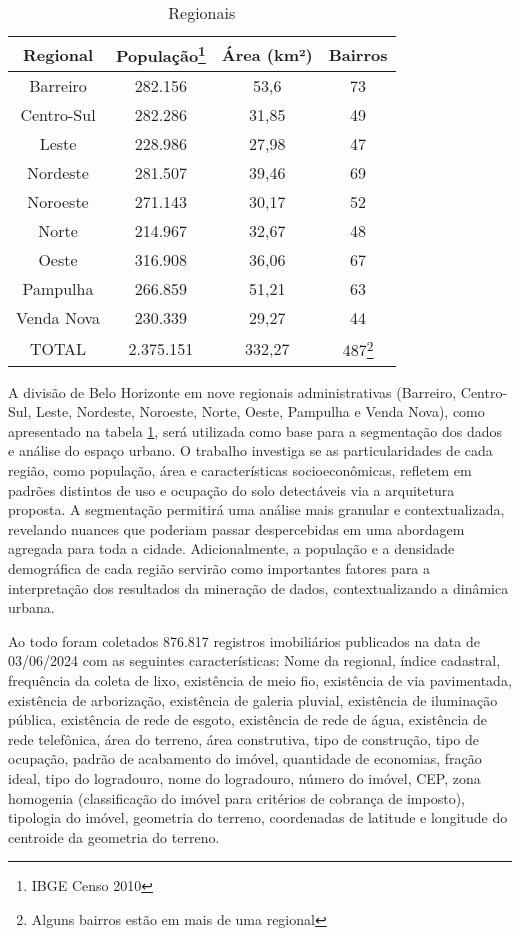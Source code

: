 \documentclass[12pt]{article}
\begin{document}
\begin{table}[h]
    \centering
    \begin{tabular}{cccc}
Regional & População\footnote{IBGE Censo 2010} & Área (km²) & Bairros\\
\hline
Barreiro & 282.156 & 53,6 & 73\\
Centro-Sul & 282.286 & 31,85 & 49\\
Leste & 228.986 & 27,98 & 47\\
Nordeste & 281.507 & 39,46 & 69\\
Noroeste & 271.143 & 30,17 & 52\\
Norte & 214.967 & 32,67 & 48\\
Oeste & 316.908 & 36,06 & 67\\
Pampulha & 266.859 & 51,21 & 63\\
Venda Nova & 230.339 & 29,27 & 44\\
\hline
\hline
TOTAL & 2.375.151 & 332,27 & 487\footnote{Alguns bairros estão em mais de uma regional}\\

    \end{tabular}
    \caption{Regionais}
    \label{tab:regionais}
\end{table}

A divisão de Belo Horizonte em nove regionais administrativas (Barreiro, Centro-Sul, Leste, Nordeste, Noroeste, Norte, Oeste, Pampulha e Venda Nova), como apresentado na tabela \ref{tab:regionais}, será utilizada como base para a segmentação dos dados e análise do espaço urbano. O trabalho investiga se as particularidades de cada região, como população, área e características socioeconômicas, refletem em padrões distintos de uso e ocupação do solo detectáveis via a arquitetura proposta. A segmentação permitirá uma análise mais granular e contextualizada, revelando nuances que poderiam passar despercebidas em uma abordagem agregada para toda a cidade. Adicionalmente, a população e a densidade demográfica de cada região servirão como importantes fatores para a interpretação dos resultados da mineração de dados, contextualizando a dinâmica urbana.

Ao todo foram coletados 876.817 registros imobiliários publicados na data de  03/06/2024 com as seguintes características: Nome da regional, índice cadastral, frequência da coleta de lixo, existência de meio fio, existência de via pavimentada, existência de arborização, existência de galeria pluvial, existência de iluminação pública, existência de rede de esgoto, existência de rede de água, existência de rede telefônica, área do terreno,  área construtiva, tipo de construção, tipo de ocupação, padrão de acabamento do imóvel, quantidade de economias, fração ideal, tipo do logradouro, nome do logradouro, número do imóvel, CEP, zona homogenia (classificação do imóvel para critérios de cobrança de imposto), tipologia do imóvel, geometria do terreno, coordenadas de latitude e longitude do centroide da geometria do terreno.
\end{document}
